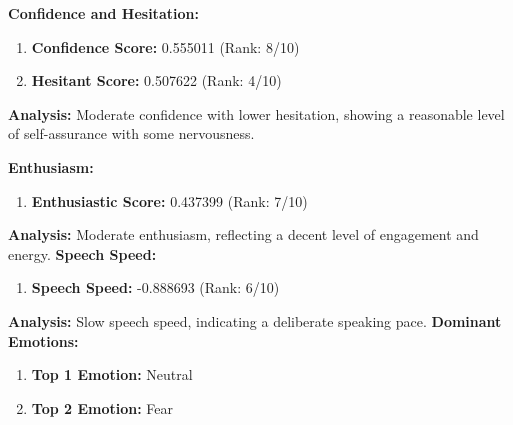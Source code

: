 \documentclass{article}
\begin{document}
\vspace{0.1in}
\large{\textbf{Confidence and Hesitation:}}
\begin{tcolorbox}[colback=green!5!white,colframe=green!75!black,title=Confidence and Hesitant Scores]
    \begin{enumerate}
        \item \textbf{Confidence Score:} \textcolor{green!50!black}{0.555011} (Rank: 8/10)
        \item \textbf{Hesitant Score:} \textcolor{red!70!black}{0.507622} (Rank: 4/10)
    \end{enumerate}
\end{tcolorbox}
    \textbf{Analysis:} Moderate confidence with lower hesitation, showing a reasonable level of self-assurance with some nervousness.

    \vspace{0.1in}
\large{\textbf{Enthusiasm:}}
\begin{tcolorbox}[colback=blue!5!white,colframe=blue!75!black,title=Enthusiastic Score]
    \begin{enumerate}
        \item \textbf{Enthusiastic Score:} \textcolor{orange!70!black}{0.437399} (Rank: 7/10)
    \end{enumerate}
\end{tcolorbox}
    \textbf{Analysis:} Moderate enthusiasm, reflecting a decent level of engagement and energy.
    \vspace{0.1in}
\large{\textbf{Speech Speed:}}
\begin{tcolorbox}[colback=cyan!5!white,colframe=cyan!75!black,title=Speech Speed]
    \begin{enumerate}
        \item \textbf{Speech Speed:} \textcolor{purple!70!black}{-0.888693} (Rank: 6/10)
    \end{enumerate}
\end{tcolorbox}
    \textbf{Analysis:} Slow speech speed, indicating a deliberate speaking pace.
    \vspace{0.1in}
\large{\textbf{Dominant Emotions:}}
\begin{tcolorbox}[colback=red!5!white,colframe=red!75!black,title=Emotional State]
    \begin{enumerate}
        \item \textbf{Top 1 Emotion:} \textcolor{blue!80!black}{Neutral}
        \item \textbf{Top 2 Emotion:} \textcolor{red!80!black}{Fear}
    \end{enumerate}
\end{tcolorbox}
\end{document}
